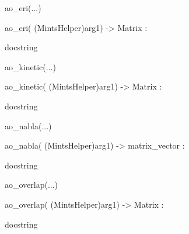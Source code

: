 \documentclass[letterpaper,10pt,english]{sphinxmanual}
\begin{document}
\begin{description}
\begin{description}
\begin{DUlineblock}{0em}
\begin{DUlineblock}{\DUlineblockindent}
\begin{DUlineblock}{\DUlineblockindent}
\item[] 
\end{DUlineblock}
\end{DUlineblock}
\item[] ao\_eri(...)
\item[]
\begin{DUlineblock}{\DUlineblockindent}
\item[] ao\_eri( (MintsHelper)arg1) -\textgreater{} Matrix :
\item[]
\begin{DUlineblock}{\DUlineblockindent}
\item[] docstring
\item[] 
\end{DUlineblock}
\end{DUlineblock}
\item[] ao\_kinetic(...)
\item[]
\begin{DUlineblock}{\DUlineblockindent}
\item[] ao\_kinetic( (MintsHelper)arg1) -\textgreater{} Matrix :
\item[]
\begin{DUlineblock}{\DUlineblockindent}
\item[] docstring
\item[] 
\end{DUlineblock}
\end{DUlineblock}
\item[] ao\_nabla(...)
\item[]
\begin{DUlineblock}{\DUlineblockindent}
\item[] ao\_nabla( (MintsHelper)arg1) -\textgreater{} matrix\_vector :
\item[]
\begin{DUlineblock}{\DUlineblockindent}
\item[] docstring
\item[] 
\end{DUlineblock}
\end{DUlineblock}
\item[] ao\_overlap(...)
\item[]
\begin{DUlineblock}{\DUlineblockindent}
\item[] ao\_overlap( (MintsHelper)arg1) -\textgreater{} Matrix :
\item[]
\begin{DUlineblock}{\DUlineblockindent}
\item[] docstring
\item[] 

\end{DUlineblock}
\end{DUlineblock}
\end{DUlineblock}
\end{description}
\end{description}
\end{document}
